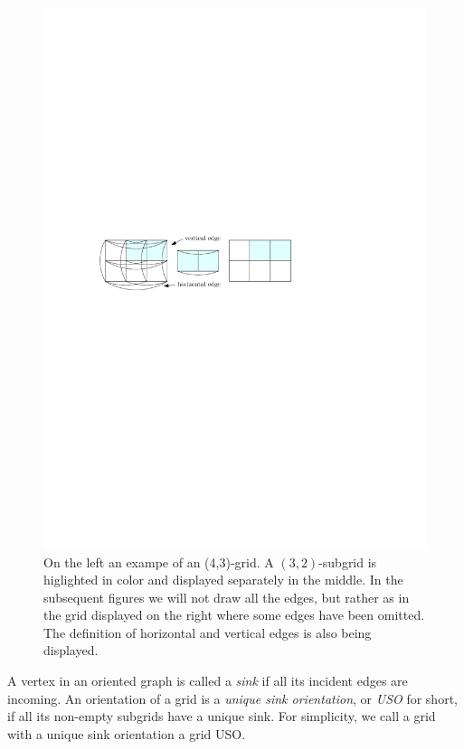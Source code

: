 \documentclass[runningheads,a4paper]{llncs}
\begin{document}
  \begin{figure}[htbp] 
  	\centering
  	\includegraphics[scale=1.0]{uso_example.pdf}
  	\caption{\small On the left an exampe of an (4,3)-grid. A $(3,2)$-subgrid is higlighted in color and displayed separately in the middle. In the subsequent figures we will not draw all the edges, but rather as in the grid displayed on the right where some edges have been omitted. The definition of horizontal and vertical edges is also being displayed.} 
  	\label{fig:examplegrid}
  \end{figure}

A vertex in an oriented graph is called a \emph{sink} if all its incident edges are incoming.
An orientation of a grid is a \emph{unique sink orientation}, or \emph{USO}
for short, if all its non-empty subgrids have a unique sink. For simplicity, we call a grid with a unique sink orientation a grid USO.
\end{document}

